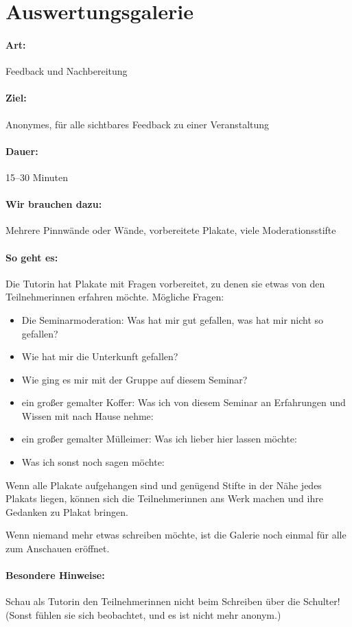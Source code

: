 \section{Auswertungsgalerie}
\paragraph{Art:} Feedback und Nachbereitung
\paragraph{Ziel:} Anonymes, für alle sichtbares Feedback zu einer Veranstaltung
\paragraph{Dauer:} 15--30 Minuten
\paragraph{Wir brauchen dazu:} Mehrere Pinnwände oder Wände, vorbereitete Plakate, viele Moderationsstifte
\paragraph{So geht es:} Die Tutorin hat Plakate mit Fragen vorbereitet, zu denen sie etwas von den Teilnehmerinnen erfahren möchte. Mögliche Fragen:
\begin{itemize}
\item Die Seminarmoderation: Was hat mir gut gefallen, was hat mir nicht so gefallen?
\item Wie hat mir die Unterkunft gefallen?
\item Wie ging es mir mit der Gruppe auf diesem Seminar?
\item ein großer gemalter Koffer: Was ich von diesem Seminar an Erfahrungen und Wissen mit nach Hause nehme:
\item ein großer gemalter Mülleimer: Was ich lieber hier lassen möchte:
\item Was ich sonst noch sagen möchte:
\end{itemize}
Wenn alle Plakate aufgehangen sind und genügend Stifte in der Nähe jedes Plakats liegen, können sich die Teilnehmerinnen ans Werk machen und ihre Gedanken zu Plakat bringen.

Wenn niemand mehr etwas schreiben möchte, ist die Galerie noch einmal für alle zum Anschauen eröffnet.
\paragraph{Besondere Hinweise:} Schau als Tutorin den Teilnehmerinnen nicht beim Schreiben über die Schulter! (Sonst fühlen sie sich beobachtet, und es ist nicht mehr anonym.)
